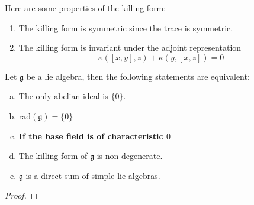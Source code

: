 \begin{remark}
    Here are some properties of the killing form:
    \begin{enumerate}
        \item The killing form is symmetric since the trace is symmetric.
        \item The killing form is invariant under the adjoint representation 
        \[\kappa([x,y],z) + \kappa(y,[x,z]) = 0\]
    \end{enumerate}
\end{remark}

\begin{proposition}
    Let \(\mathfrak{g}\) be a lie algebra, then the following statements are equivalent:
    \begin{enumerate}[(a)]
        \item  The only abelian ideal is \(\{0\}\).
        \item \(\mathrm{rad}(\mathfrak{g}) = \{0\}\) 
        \item[] \textbf{If the base field is of characteristic \(0\)}
        \item The killing form of \(\mathfrak{g}\) is non-degenerate.
        \item \(\mathfrak{g}\) is a direct sum of simple lie algebras.
    \end{enumerate}
\end{proposition}

\begin{proof}
    
\end{proof}
